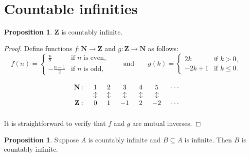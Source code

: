 \documentclass[12pt]{article}
\theoremstyle{definition}
\newtheorem{proposition}[definition]{Proposition}
\newcommand{\N}{\mathbf{N}}
\newcommand{\Z}{\mathbf{Z}}
\begin{document}
\section{Countable infinities}
\label{sec:countable_infinities}

\begin{proposition}
\label{prop:Z_is_countable}
    \( \Z \) is countably infinite.
\end{proposition}

\begin{proof}
    Define functions \( f : \N \to \Z \) and \( g : \Z \to \N \) as follows:
    \[
    f(n) = \begin{cases}
        \frac{n}{2} & \text{if } n \text{ is even}, \\
        -\frac{n-1}{2} & \text{if } n \text{ is odd},
    \end{cases}
    \qquad \text{and} \qquad
    g(k) = \begin{cases}
        2k & \text{if } k > 0, \\
        -2k + 1 & \text{if } k \leq 0.
    \end{cases}
    \]

    \[
    \begin{tikzcd}[column sep = tiny, row sep = small]
        \N : & 1 \arrow[d, leftrightarrow] & 2 \arrow[d, leftrightarrow] & 3 \arrow[d, leftrightarrow] & 4 \arrow[d, leftrightarrow] & 5 \arrow[d, leftrightarrow] & \cdots \\
        \Z : & 0 & 1 & -1 & 2 & -2 & \cdots \\
    \end{tikzcd}
    \]
    It is straightforward to verify that \( f \) and \( g \) are mutual inverses.
\end{proof}

\begin{proposition}
\label{prop:infinite_subset_of_countable_set_is_countable}
    Suppose \( A \) is countably infinite and \( B \subseteq A \) is infinite. Then \( B \) is countably infinite.
\end{proposition}
\end{document}
